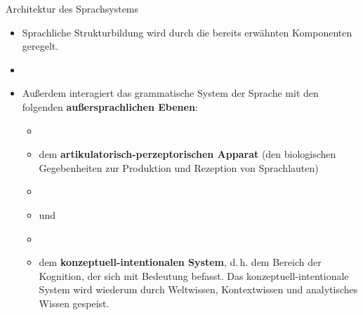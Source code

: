 \begin{frame}{Architektur des Sprachsystems}
	
	\begin{itemize}
		\item Sprachliche Strukturbildung wird durch die bereits erwähnten Komponenten geregelt.
		\item[]
		\item<2-> Außerdem interagiert das grammatische System der Sprache mit den folgenden \textbf{außersprachlichen Ebenen}:
				
		\begin{itemize}
			\item[]
			\item<3-> dem \textbf{artikulatorisch-perzeptorischen Apparat} (den biologischen Gegebenheiten zur Produktion und Rezeption von Sprachlauten)
			\item[]
			\item<3->[] und
			\item[]
			\item<4-> dem \textbf{konzeptuell-intentionalen System}, d.\,h. dem Bereich der Kognition, der sich mit Bedeutung befasst. Das konzeptuell-intentionale System wird wiederum durch Weltwissen, Kontextwissen und analytisches Wissen gespeist.
		\end{itemize}
			
	\end{itemize}
		
\end{frame}



				




